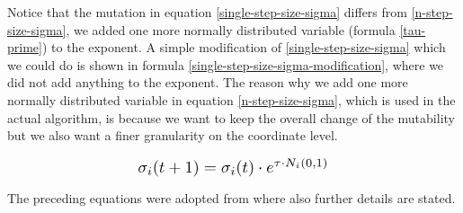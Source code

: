Notice that the mutation in equation \ref{single-step-size-sigma} differs from \ref{n-step-size-sigma}, we added one more normally distributed variable (formula \ref{tau-prime}) to the exponent. A simple modification of \ref{single-step-size-sigma} which we could do is shown in formula \ref{single-step-size-sigma-modification}, where we did not add anything to the exponent. The reason why we add one more normally distributed variable in equation \ref{n-step-size-sigma}, which is used in the actual algorithm, is because we want to keep the overall change of the mutability but we also want a finer granularity on the coordinate level.

\begin{equation}\label{single-step-size-sigma-modification}
\scalebox{1.3}{
    $\sigma_i(t+1) = \sigma_i(t) \cdot e^{\tau \cdot N_i(0,1)}$
}
\end{equation}

The preceding equations were adopted from \cite{natural-computing-algorithms, introduction-to-evolutionary-computing} where also further details are stated.